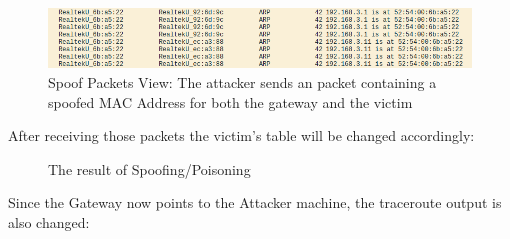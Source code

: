 \begin{figure}[h!]
 \centering
 \includegraphics[width=13cm]{img/wireshark_arp_spoof.png}
 \caption{ Spoof Packets View: The attacker sends an  packet containing a spoofed MAC Address for both the gateway and the victim}
 \label{fig: ARP Spoof Wireshark}
\end{figure}

After receiving those packets the victim's  table will be changed accordingly:

\begin{figure}[!hb]
\centering
 \vspace{0.5cm}
 \caption{The result of  Spoofing/Poisoning}\label{fig: spoof-before-after}
\end{figure}

Since the Gateway now points to the Attacker machine, the traceroute output is also changed:

\begin{figure}[!hb]
 \centering
 \vspace{0.5cm}
\end{figure}

